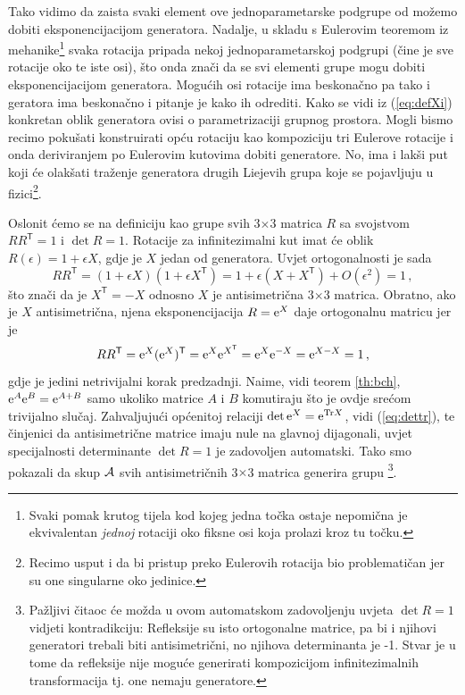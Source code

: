 Tako vidimo da zaista svaki element ove jednoparametarske podgrupe
od  možemo dobiti eksponencijacijom generatora. 
Nadalje, u skladu s Eulerovim teoremom iz mehanike\footnote{Svaki pomak krutog
tijela kod kojeg jedna točka ostaje nepomična je ekvivalentan \emph{jednoj}
rotaciji oko fiksne osi koja prolazi kroz tu točku. }
svaka  rotacija pripada nekoj jednoparametarskoj podgrupi
 (čine je sve rotacije oko te iste osi), što onda znači da se
svi elementi grupe  mogu dobiti eksponencijacijom generatora.
Mogućih osi rotacije ima beskonačno pa tako i geratora ima beskonačno
i pitanje je kako ih odrediti.
Kako se vidi iz (\ref{eq:defXi}) konkretan oblik generatora ovisi
o parametrizaciji grupnog prostora. 
Mogli bismo recimo pokušati konstruirati opću rotaciju kao kompoziciju tri
 Eulerove rotacije i onda deriviranjem po Eulerovim kutovima dobiti
 generatore.  No, ima i lakši put koji će olakšati traženje 
 generatora drugih Liejevih grupa koje se pojavljuju u fizici\footnote{Recimo
     usput i da bi pristup preko Eulerovih rotacija
     bio  problematičan jer su one singularne oko jedinice.}.

Oslonit ćemo se na definiciju  kao grupe svih 
3$\times$3 matrica $R$ sa svojstvom  $RR^\mathsf{T}=1$ i $\det R=1$.
Rotacije za infinitezimalni kut imat će oblik  $R(\epsilon)=1+\epsilon X$,
gdje je $X$ jedan od generatora. Uvjet ortogonalnosti je sada
\begin{equation} \label{eq:Xantisim}
 RR^\mathsf{T}=(1+\epsilon X)(1+\epsilon 
   X^\mathsf{T}) = 1+\epsilon (X+X^\mathsf{T})+O(\epsilon^2) = 1 \,,
\end{equation}
što znači da je $X^\mathsf{T}=-X$ odnosno $X$ je antisimetrična 3$\times$3 matrica.
Obratno, ako je $X$ antisimetrična, njena eksponencijacija $R = \textrm{e}^X$ daje ortogonalnu
matricu jer je
\begin{equation}
  R R^\mathsf{T} = \textrm{e}^X (\textrm{e}^X)^\mathsf{T} = \textrm{e}^X \textrm{e}^{X^\mathsf{T}}
  = \textrm{e}^X \textrm{e}^{-X}
  = \textrm{e}^{X-X} = 1 \,,
\end{equation}
gdje je jedini netrivijalni korak predzadnji. Naime, vidi teorem \ref{th:bch},
$\textrm{e}^{A} \textrm{e}^{B} = \textrm{e}^{A+B}$ samo ukoliko matrice $A$ i $B$ komutiraju što je ovdje
srećom trivijalno slučaj.
Zahvaljujući općenitoj relaciji $\det \textrm{e}^{X} = \textrm{e}^{\textrm{\scriptsize Tr} X}$,
vidi (\ref{eq:dettr}), te činjenici da antisimetrične matrice imaju
nule na glavnoj dijagonali, uvjet specijalnosti determinante $\det R = 1$ je
zadovoljen automatski.
Tako smo pokazali da skup $\mathcal{A}$ svih antisimetričnih 3$\times$3 matrica
generira grupu \footnote{Pažljivi čitaoc će možda u ovom automatskom
    zadovoljenju uvjeta $\det R =1$ vidjeti kontradikciju:
 Refleksije su isto ortogonalne matrice,
pa bi i njihovi generatori trebali biti antisimetrični, no njihova determinanta
je -1. Stvar je u tome da refleksije nije moguće generirati kompozicijom
infinitezimalnih transformacija tj. one nemaju generatore.\label{fus:refleksija}}.

